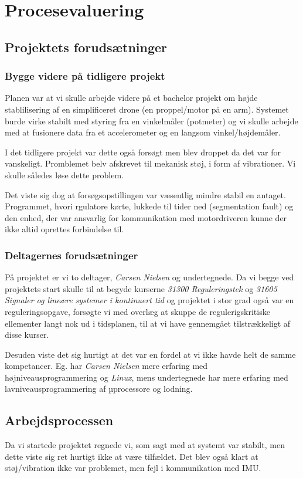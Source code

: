 


\section{Procesevaluering}
\subsection{Projektets forudsætninger}
\subsubsection{Bygge videre på tidligere projekt}
Planen var at vi skulle arbejde videre på et bachelor projekt om højde
stablilisering af en simplificeret drone (en proppel/motor på en arm).
Systemet burde virke stabilt med styring fra en vinkelmåler
(potmeter) og vi skulle arbejde med at fusionere data fra et accelerometer og en
langsom vinkel/højdemåler.

I det tidligere projekt var dette også forsøgt men blev droppet da det var for
vanskeligt. Promblemet belv afskrevet til mekanisk støj, i form af vibrationer.
Vi skulle således løse dette problem.

Det viste sig dog at forsøgsopstillingen var væsentlig mindre stabil en antaget.
Programmet, hvori rgulatore kørte, lukkede til tider ned (segmentation fault) og
den enhed, der var ansvarlig for kommunikation med motordriveren kunne der ikke
altid oprettes forbindelse til.

\subsubsection{Deltagernes forudsætninger}
På projektet er vi to deltager, \emph{Carsen Nielsen} og undertegnede.
Da vi begge ved projektets start skulle til at begyde kurserne \emph{31300
Reguleringstek} og \emph{31605 Signaler og lineære systemer i kontinuert tid}
og projektet i stor grad også var en reguleringsopgave, forsøgte vi med overlæg at
skuppe de regulerigskritiske ellementer langt nok ud i tidsplanen, til at vi
have gennemgået tilstrækkeligt af disse kurser.

Desuden viste det sig hurtigt at det var en fordel at vi ikke havde helt de
samme kompetancer. Eg. har \emph{Carsen Nielsen} mere erfaring med
højniveausprogrammering og \emph{Linux}, mens undertegnede har mere erfaring med
lavniveausprogrammering af µprocessore og lodning.

\subsection{Arbejdsprocessen}
Da vi startede projektet regnede vi, som sagt med at systemt var stabilt, men
dette viste sig ret hurtigt ikke at være tilfældet.
Det blev også klart at støj/vibration ikke var problemet, men fejl i
kommunikation med IMU.

